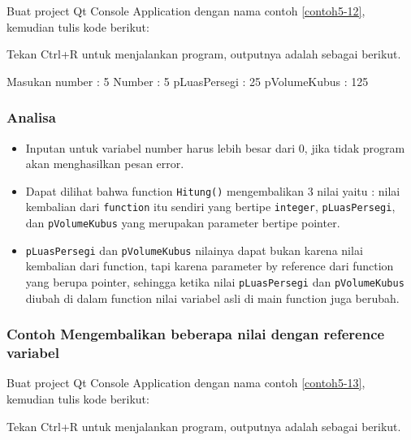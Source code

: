 Buat project Qt Console Application dengan nama contoh \ref{contoh5-12}, kemudian
tulis kode berikut:



Tekan Ctrl+R untuk menjalankan program, outputnya adalah sebagai
berikut.

\begin{lcverbatim}
Masukan number : 5
Number : 5
pLuasPersegi : 25
pVolumeKubus : 125
\end{lcverbatim}

\subsubsection*{Analisa}

\begin{itemize}

\item
 Inputan untuk variabel number harus lebih besar dari 0, jika tidak
 program akan menghasilkan pesan error.
\item
 Dapat dilihat bahwa function \texttt{Hitung()} mengembalikan 3 nilai
 yaitu : nilai kembalian dari \texttt{function} itu sendiri yang
 bertipe \texttt{integer}, \texttt{pLuasPersegi}, dan
 \texttt{pVolumeKubus} yang merupakan parameter bertipe pointer.
\item
 \texttt{pLuasPersegi} dan \texttt{pVolumeKubus} nilainya dapat bukan
 karena nilai kembalian dari function, tapi karena parameter by
 reference dari function yang berupa pointer, sehingga ketika nilai
 \texttt{pLuasPersegi} dan \texttt{pVolumeKubus} diubah di dalam
 function nilai variabel asli di main function juga berubah.
\end{itemize}

\subsubsection*{Contoh Mengembalikan beberapa nilai dengan reference variabel}

Buat project Qt Console Application dengan nama contoh \ref{contoh5-13}, kemudian
tulis kode berikut:



Tekan Ctrl+R untuk menjalankan program, outputnya adalah sebagai
berikut.

